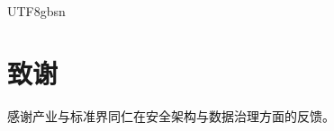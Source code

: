 \documentclass[letterpaper,twocolumn,10pt]{article}
\begin{document}
\begin{CJK}{UTF8}{gbsn}
\section*{致谢}
感谢产业与标准界同仁在安全架构与数据治理方面的反馈。




\end{CJK}
\end{document}
